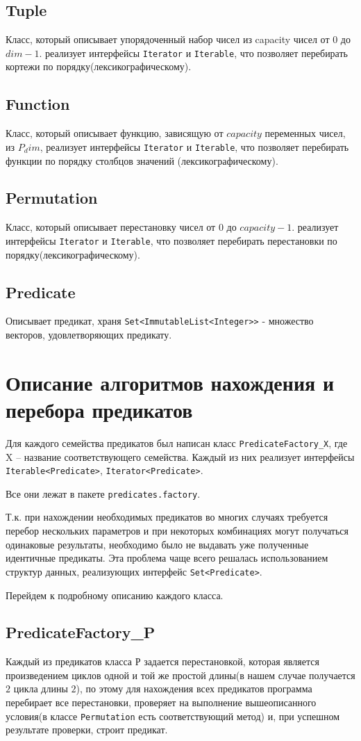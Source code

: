 \documentclass[a4paper,14pt]{extreport}
\begin{document}
\subsection{Tuple}
Класс, который описывает упорядоченный набор чисел из capacity чисел от $0$ до $dim-1$. реализует интерфейсы {\tt Iterator} и {\tt Iterable}, что позволяет перебирать кортежи по порядку(лексикографическому).
\subsection{Function}
Класс, который описывает функцию, зависящую от $capacity$ переменных чисел, из $P_dim$, реализует интерфейсы {\tt Iterator} и {\tt Iterable}, что позволяет перебирать функции по порядку столбцов значений (лексикографическому).
\subsection{Permutation}
Класс, который описывает перестановку чисел от $0$ до $capacity-1$. реализует интерфейсы {\tt Iterator} и {\tt Iterable}, что позволяет перебирать перестановки по порядку(лексикографическому).
\subsection{Predicate} 
Описывает предикат, храня {\tt Set<ImmutableList<Integer>>} - множество векторов, удовлетворяющих предикату.

\section{Описание алгоритмов нахождения и перебора предикатов}
Для каждого семейства предикатов был написан класс {\tt PredicateFactory\_X}, где X – название соответствующего семейства. Каждый из них реализует интерфейсы {\tt Iterable<Predicate>}, {\tt Iterator<Predicate>}.

Все они лежат в пакете {\tt predicates.factory}.

Т.к. при нахождении необходимых предикатов во многих случаях требуется перебор нескольких параметров и при некоторых комбинациях могут получаться  одинаковые результаты, необходимо было не выдавать уже полученные идентичные предикаты. Эта  проблема чаще всего решалась использованием структур данных, реализующих интерфейс {\tt Set<Predicate>}. 

Перейдем к подробному описанию каждого класса.

\subsection{PredicateFactory\_P}
Каждый из предикатов класса $Р$ задается перестановкой, которая является произведением циклов одной и той же простой длины(в нашем случае получается $2$ цикла длины $2$), по этому для нахождения всех предикатов программа перебирает все перестановки, проверяет на выполнение вышеописанного условия(в классе {\tt Permutation} есть соответствующий метод) и, при успешном результате проверки, строит предикат.
\end{document}
